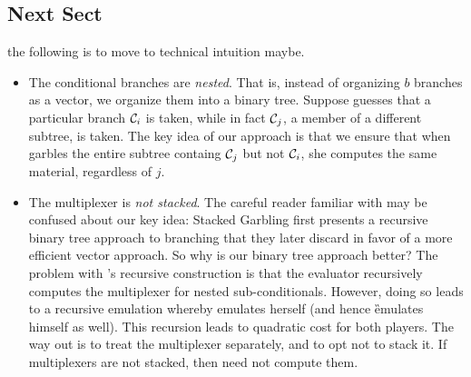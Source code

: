     
\medskip


\subsection{Next Sect}


the following is to move to technical intuition maybe.
\begin{itemize}

      \item The conditional branches are \emph{nested}.
    That is, instead of organizing $b$ branches as a vector, we
    organize them into a binary tree.
    Suppose \E guesses that a particular branch $\mathcal{C}_i$ is taken,
    while in fact $\mathcal{C}_j$, a member of a different subtree, is taken.
    The key idea of our approach is that we ensure that when \ev
    garbles the entire subtree containg $\mathcal{C}_j$ but not $\mathcal{C}_i$, she
    computes the same material, regardless of $j$.
  \item The multiplexer is \emph{not stacked}.
    The careful reader familiar with \cite{EPRINT:HeaKol20b} may be
    confused about our key idea: Stacked Garbling first presents a
    recursive binary tree approach to branching that they later
    discard in favor of a more efficient vector approach.
    So why is our binary tree approach better?
    The problem with \cite{EPRINT:HeaKol20b}'s recursive construction
    is that the evaluator recursively computes the multiplexer for
    nested sub-conditionals.
    However, doing so leads to a recursive emulation whereby \E
    emulates herself (and hence \G emulates himself as well).
    This recursion leads to quadratic cost for both players.
    The way out is to treat the multiplexer separately, and to opt not
    to stack it.
    If multiplexers are not stacked, then \E need not compute them.
\end{itemize}


